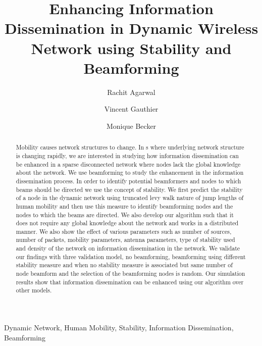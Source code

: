 \documentclass[preprint, twocolumn,5p]{elsarticle}
\begin{document}
\title{Enhancing Information Dissemination in Dynamic Wireless Network using Stability and Beamforming}

\author[TSP]{Rachit Agarwal}
\author[TSP]{Vincent Gauthier}
\author[TSP]{Monique Becker}

\address[TSP]{Telecom SudParis, 9 Rue Charles Fourier, Evry, 91011, France}


\begin{abstract}
Mobility causes network structures to change. In s where underlying network structure is changing rapidly, we are interested in studying how information dissemination can be enhanced in a sparse disconnected network where nodes lack the global knowledge about the network. We use beamforming to study the enhancement in the information dissemination process. In order to identify potential beamformers and nodes to which beams should be directed we use the concept of stability. We first predict the stability of a node in the dynamic network using truncated levy walk nature of jump lengths of human mobility and then use this measure to identify beamforming nodes and the nodes to which the beams are directed. We also develop our algorithm such that it does not require any global knowledge about the network and works in a distributed manner. We also show the effect of various parameters such as number of sources, number of packets, mobility parameters, antenna parameters, type of stability used and density of the network on information dissemination in the network. We validate our findings with three validation model, no beamforming, beamforming using different stability measure and when no stability measure is associated but same number of node beamform and the selection of the beamforming nodes is random. Our simulation results show that information dissemination can be enhanced using our algorithm over other models.
\end{abstract}

\begin{keyword}
Dynamic Network, Human Mobility, Stability, Information Dissemination, Beamforming
\end{keyword}

\maketitle
\end{document}
